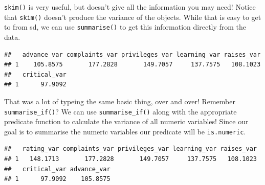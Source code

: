 \documentclass[]{book}
\newenvironment{Shaded}{\begin{snugshade}}{\end{snugshade}}
\newcommand{\DataTypeTok}[1]{\textcolor[rgb]{0.13,0.29,0.53}{#1}}
\newcommand{\KeywordTok}[1]{\textcolor[rgb]{0.13,0.29,0.53}{\textbf{#1}}}
\newcommand{\NormalTok}[1]{#1}
\newcommand{\OperatorTok}[1]{\textcolor[rgb]{0.81,0.36,0.00}{\textbf{#1}}}
\newcommand{\StringTok}[1]{\textcolor[rgb]{0.31,0.60,0.02}{#1}}
\theoremstyle{definition}
\theoremstyle{definition}
\theoremstyle{definition}
\theoremstyle{remark}
\begin{document}
\texttt{skim()} is very useful, but doesn't give all the information you may need! Notice that \texttt{skim()} doesn't produce the variance of the objects. While that is easy to get to from sd, we can use \texttt{summarise()} to get this information directly from the data.

\begin{Shaded}
\end{Shaded}

\begin{verbatim}
##   advance_var complaints_var privileges_var learning_var raises_var
## 1    105.8575       177.2828       149.7057     137.7575   108.1023
##   critical_var
## 1      97.9092
\end{verbatim}

That was a lot of typeing the same basic thing, over and over! Remember \texttt{summarise\_if()}? We can use \texttt{summarise\_if()} along with the appropriate predicate function to calculate the variance of all numeric variables! Since our goal is to summarise the numeric variables our predicate will be \texttt{is.numeric}.

\begin{Shaded}
\end{Shaded}

\begin{verbatim}
##   rating_var complaints_var privileges_var learning_var raises_var
## 1   148.1713       177.2828       149.7057     137.7575   108.1023
##   critical_var advance_var
## 1      97.9092    105.8575
\end{verbatim}
\end{document}
